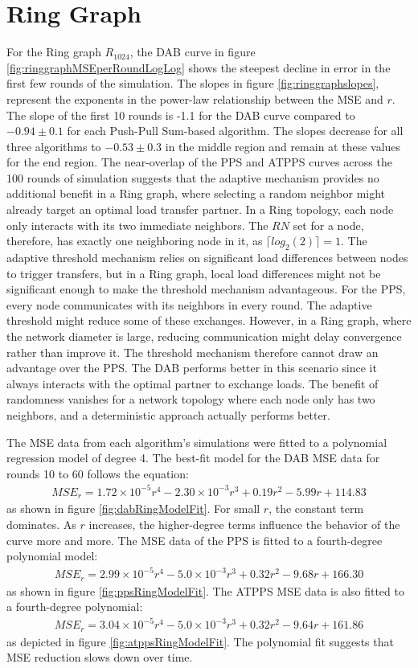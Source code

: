 \section{Ring Graph}\label{sec:ringgraph}
For the Ring graph $R_{1024}$, the DAB curve in figure \ref{fig:ringgraphMSEperRoundLogLog} shows the steepest decline in error in the first few rounds of the simulation. The slopes in figure \ref{fig:ringgraphslopes}, represent the exponents in the power-law relationship between the MSE and $r$. The slope of the first 10 rounds is -1.1 for the DAB curve compared to $-0.94 \pm 0.1$ for each Push-Pull Sum-based algorithm. The slopes decrease for all three algorithms to $-0.53 \pm 0.3$ in the middle region and remain at these values for the end region. The near-overlap of the PPS and ATPPS curves across the 100 rounds of simulation suggests that the adaptive mechanism provides no additional benefit in a Ring graph, where selecting a random neighbor might already target an optimal load transfer partner. In a Ring topology, each node only interacts with its two immediate neighbors. The $RN$ set for a node, therefore, has exactly one neighboring node in it, as $\lceil log_{2}{(2)}\rceil = 1$. The adaptive threshold mechanism relies on significant load differences between nodes to trigger transfers, but in a Ring graph, local load differences might not be significant enough to make the threshold mechanism advantageous. For the PPS, every node communicates with its neighbors in every round. The adaptive threshold might reduce some of these exchanges. However, in a Ring graph, where the network diameter is large, reducing communication might delay convergence rather than improve it. The threshold mechanism therefore cannot draw an advantage over the PPS. The DAB performs better in this scenario since it always interacts with the optimal partner to exchange loads. The benefit of randomness vanishes for a network topology where each node only has two neighbors, and a deterministic approach actually performs better.

The MSE data from each algorithm's simulations were fitted to a polynomial regression model of degree 4. The best-fit model for the DAB MSE data for rounds 10 to 60 follows the equation:
\begin{align}
    MSE_r=1.72\times 10^{-5}r^{4}-2.30\times 10^{-3}r^{3}+ 0.19r^{2}-5.99r+114.83
\end{align}
as shown in figure \ref{fig:dabRingModelFit}. For small $r$, the constant term dominates. As $r$ increases, the higher-degree terms influence the behavior of the curve more and more. The MSE data of the PPS is fitted to a fourth-degree polynomial model:
\begin{align}
    MSE_r= 2.99\times 10^{-5}r^{4}-5.0\times 10^{-3}r^{3} + 0.32r^{2} -9.68r + 166.30
\end{align}
as shown in figure \ref{fig:ppsRingModelFit}. The ATPPS MSE data is also fitted to a fourth-degree polynomial:
\begin{align}
    MSE_r=3.04\times 10^{-5}r^{4}-5.0\times 10^{-3}r^{3} + 0.32r^{2}-9.64r+161.86
\end{align}
as depicted in figure \ref{fig:atppsRingModelFit}. The polynomial fit suggests that MSE reduction slows down over time.

